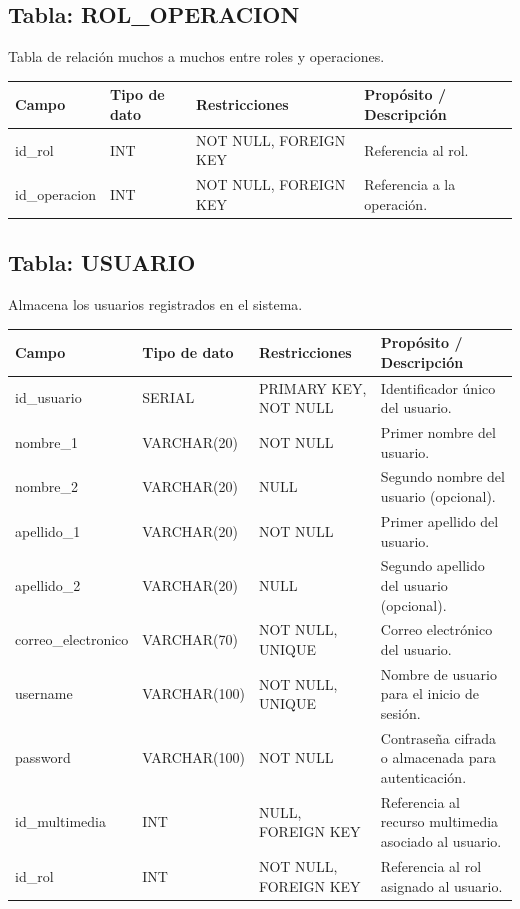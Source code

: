 \documentclass[12pt,a4paper]{article}
\begin{document}
\subsection{Tabla: ROL\_OPERACION}

Tabla de relación muchos a muchos entre roles y operaciones.

\begin{longtable}{|p{3.5cm}|p{2.5cm}|p{3.5cm}|p{5cm}|}
\hline
\textbf{Campo} & \textbf{Tipo de dato} & \textbf{Restricciones} & \textbf{Propósito / Descripción} \\
\hline
id\_rol & INT & NOT NULL, FOREIGN KEY & Referencia al rol. \\
\hline
id\_operacion & INT & NOT NULL, FOREIGN KEY & Referencia a la operación. \\
\hline
\end{longtable}

\subsection{Tabla: USUARIO}

Almacena los usuarios registrados en el sistema.

\begin{longtable}{|p{3.5cm}|p{2.5cm}|p{3.5cm}|p{5cm}|}
\hline
\textbf{Campo} & \textbf{Tipo de dato} & \textbf{Restricciones} & \textbf{Propósito / Descripción} \\
\hline
id\_usuario & SERIAL & PRIMARY KEY, NOT NULL & Identificador único del usuario. \\
\hline
nombre\_1 & VARCHAR(20) & NOT NULL & Primer nombre del usuario. \\
\hline
nombre\_2 & VARCHAR(20) & NULL & Segundo nombre del usuario (opcional). \\
\hline
apellido\_1 & VARCHAR(20) & NOT NULL & Primer apellido del usuario. \\
\hline
apellido\_2 & VARCHAR(20) & NULL & Segundo apellido del usuario (opcional). \\
\hline
correo\_electronico & VARCHAR(70) & NOT NULL, UNIQUE & Correo electrónico del usuario. \\
\hline
username & VARCHAR(100) & NOT NULL, UNIQUE & Nombre de usuario para el inicio de sesión. \\
\hline
password & VARCHAR(100) & NOT NULL & Contraseña cifrada o almacenada para autenticación. \\
\hline
id\_multimedia & INT & NULL, FOREIGN KEY & Referencia al recurso multimedia asociado al usuario. \\
\hline
id\_rol & INT & NOT NULL, FOREIGN KEY & Referencia al rol asignado al usuario. \\
\hline
\end{longtable}
\end{document}
